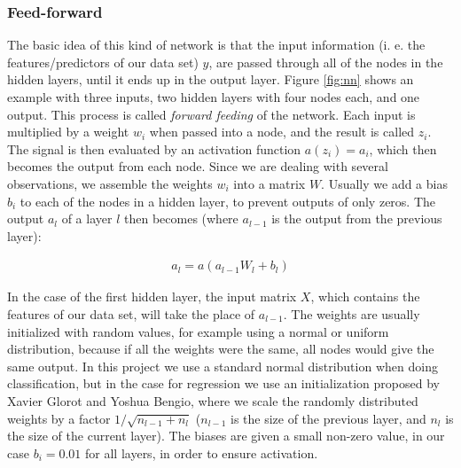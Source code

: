 \subsubsection{Feed-forward}\label{feed-forward}

The basic idea of this kind of network is that the input information (i.
e. the features/predictors of our data set) \(y\), are passed through
all of the nodes in the hidden layers, until it ends up in the output
layer. Figure \ref{fig:nn} shows an example with three inputs, two hidden
layers with four nodes each, and one output. This process is called
\emph{forward feeding} of the network. Each input is multiplied by a
weight \(w_i\) when passed into a node, and the result is called
\(z_i\). The signal is then evaluated by an activation function
\(a(z_i) = a_i\), which then becomes the output from each node. Since
we are dealing with several observations, we assemble the weights
\(w_i\) into a matrix \(W\). Usually we add a bias \(b_i\) to each of the
nodes in a hidden layer, to prevent outputs of only zeros. The output
\(a_l\) of a layer \(l\) then becomes (where \(a_{l-1}\) is the output
from the previous layer):

\begin{align}
a_l = a(a_{l-1} W_l + b_l)
\label{eq:feedforward}
\end{align}

In the case of the first hidden layer, the input matrix \(X\), which contains the features of our data set, will take
the place of \(a_{l-1}\). The weights are usually initialized with
random values, for example using a normal or uniform distribution,
because if all the weights were the same, all nodes would give the
same output. In this project we use a standard normal distribution when
doing classification, but in the case for regression we use an
initialization proposed by Xavier Glorot and Yoshua
Bengio\cite{glorot}, where we scale the randomly
distributed weights by a factor \(1/\sqrt{n_{l-1} + n_l}\) (\(n_{l-1}\) is
the size of the previous layer, and \(n_l\) is the size of the current
layer). The biases are given a small non-zero value, in our case
\(b_i = 0.01\) for all layers, in order to ensure activation.

